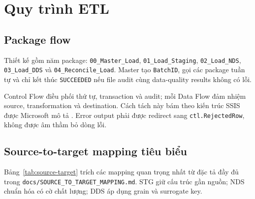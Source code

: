 \documentclass[12pt,a4paper,oneside]{report}
\begin{document}
\chapter{Quy trình ETL}
\section{Package flow}
Thiết kế gồm năm package: \texttt{00\_Master\_Load}, \texttt{01\_Load\_Staging}, \texttt{02\_Load\_NDS}, \texttt{03\_Load\_DDS} và \texttt{04\_Reconcile\_Load}. Master tạo \texttt{BatchID}, gọi các package tuần tự và chỉ kết thúc \texttt{SUCCEEDED} nếu file audit cùng data-quality results không có lỗi.

Control Flow điều phối thứ tự, transaction và audit; mỗi Data Flow đảm nhiệm source, transformation và destination. Cách tách này bám theo kiến trúc SSIS được Microsoft mô tả \cite{ssisflow}. Error output phải được redirect sang \texttt{ctl.RejectedRow}, không được âm thầm bỏ dòng lỗi.

\section{Source-to-target mapping tiêu biểu}
Bảng~\ref{tab:source-target} trích các mapping quan trọng nhất từ đặc tả đầy đủ trong \texttt{docs/SOURCE\_TO\_TARGET\_MAPPING.md}. STG giữ cấu trúc gần nguồn; NDS chuẩn hóa có cờ chất lượng; DDS áp dụng grain và surrogate key.
\end{document}
